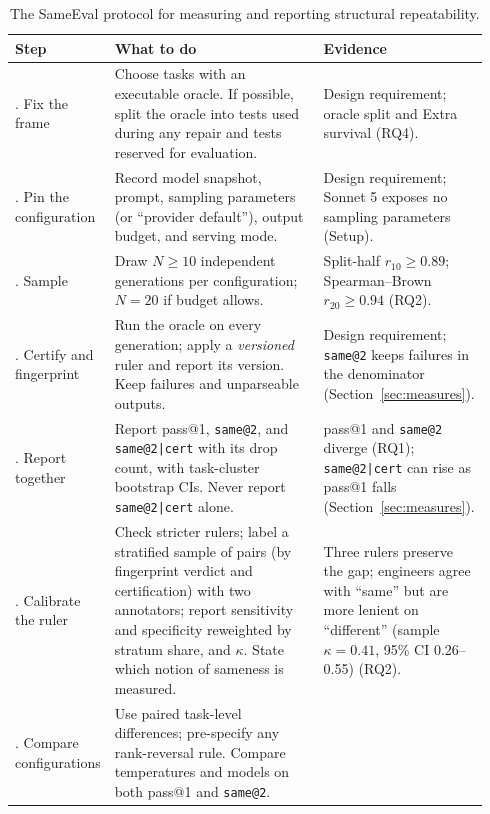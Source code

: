 \documentclass[acmsmall,screen,review,anonymous]{acmart}
\makeatletter
\newcommand{\sameeval}{SameEval}
\newcommand{\sameat}{\mbox{\texttt{same@2}}}
\newcommand{\sameatc}{\mbox{\texttt{same@2|cert}}}
\makeatother
\begin{document}
\begin{table}[t]
  \small
  \setlength{\tabcolsep}{4pt}
  \caption{The \sameeval{} protocol for measuring and reporting structural
    repeatability.}
  \label{tab:protocol}
  \begin{tabular}{@{}>{\raggedright\arraybackslash}p{0.20\linewidth}>{\raggedright\arraybackslash}p{0.47\linewidth}>{\raggedright\arraybackslash}p{0.27\linewidth}@{}}
    \toprule
    Step & What to do & Evidence \\
    \midrule
    1. Fix the frame &
      Choose tasks with an executable oracle. If possible, split the oracle
      into tests used during any repair and tests reserved for evaluation. &
      Design requirement; oracle split and Extra survival (RQ4). \\
    2. Pin the configuration &
      Record model snapshot, prompt, sampling parameters (or ``provider
      default''), output budget, and serving mode. &
      Design requirement; Sonnet 5 exposes no sampling parameters (Setup). \\
    3. Sample &
      Draw $N{\ge}10$ independent generations per configuration; $N{=}20$ if
      budget allows. &
      Split-half $r_{10}{\ge}0.89$; Spearman--Brown $r_{20}{\ge}0.94$ (RQ2). \\
    4. Certify and fingerprint &
      Run the oracle on every generation; apply a \emph{versioned} ruler and
      report its version. Keep failures and unparseable outputs. &
      Design requirement; \sameat{} keeps failures in the denominator
      (Section~\ref{sec:measures}). \\
    5. Report together &
      Report pass@1, \sameat{}, and \sameatc{} with its drop count, with
      task-cluster bootstrap CIs. Never report \sameatc{} alone. &
      pass@1 and \sameat{} diverge (RQ1); \sameatc{} can rise as pass@1 falls
      (Section~\ref{sec:measures}). \\
    6. Calibrate the ruler &
      Check stricter rulers; label a stratified sample of pairs (by
      fingerprint verdict and certification) with two annotators; report
      sensitivity and specificity reweighted by stratum share, and $\kappa$. State which notion of sameness
      is measured. &
      Three rulers preserve the gap; engineers agree with ``same'' but are
      more lenient on ``different'' (sample $\kappa{=}0.41$, 95\% CI
      0.26--0.55) (RQ2). \\
    7. Compare configurations &
      Use paired task-level differences; pre-specify any rank-reversal
      rule. Compare temperatures and models on both pass@1 and \sameat{}. &

\end{tabular}
\end{table}
\end{document}

